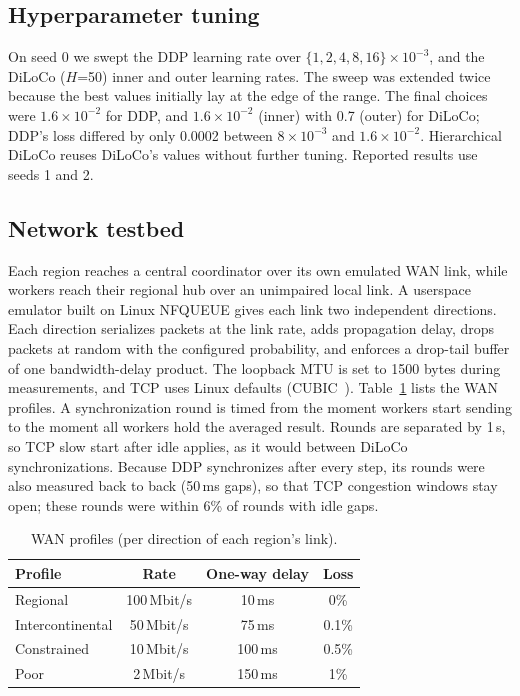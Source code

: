 \documentclass[conference]{IEEEtran}
\begin{document}
\subsection{Hyperparameter tuning}
On seed 0 we swept the DDP learning rate over $\{1,2,4,8,16\}\times10^{-3}$, and the DiLoCo ($H$=50) inner and outer learning rates. The sweep was extended twice because the best values initially lay at the edge of the range. The final choices were $1.6\times10^{-2}$ for DDP, and $1.6\times10^{-2}$ (inner) with 0.7 (outer) for DiLoCo; DDP's loss differed by only 0.0002 between $8\times10^{-3}$ and $1.6\times10^{-2}$. Hierarchical DiLoCo reuses DiLoCo's values without further tuning. Reported results use seeds 1 and 2.

\subsection{Network testbed}
Each region reaches a central coordinator over its own emulated WAN link, while workers reach their regional hub over an unimpaired local link. A userspace emulator built on Linux NFQUEUE gives each link two independent directions. Each direction serializes packets at the link rate, adds propagation delay, drops packets at random with the configured probability, and enforces a drop-tail buffer of one bandwidth-delay product. The loopback MTU is set to 1500 bytes during measurements, and TCP uses Linux defaults (CUBIC~\cite{cubic}). Table~\ref{tab:profiles} lists the WAN profiles. A synchronization round is timed from the moment workers start sending to the moment all workers hold the averaged result. Rounds are separated by 1\,s, so TCP slow start after idle applies, as it would between DiLoCo synchronizations. Because DDP synchronizes after every step, its rounds were also measured back to back (50\,ms gaps), so that TCP congestion windows stay open; these rounds were within 6\% of rounds with idle gaps.

\begin{table}[t]
\caption{WAN profiles (per direction of each region's link).}
\label{tab:profiles}
\centering\footnotesize
\begin{tabular}{@{}lccc@{}}
\toprule
Profile & Rate & One-way delay & Loss \\
\midrule
Regional & 100\,Mbit/s & 10\,ms & 0\% \\
Intercontinental & 50\,Mbit/s & 75\,ms & 0.1\% \\
Constrained & 10\,Mbit/s & 100\,ms & 0.5\% \\
Poor & 2\,Mbit/s & 150\,ms & 1\% \\
\bottomrule
\end{tabular}
\end{table}
\end{document}
